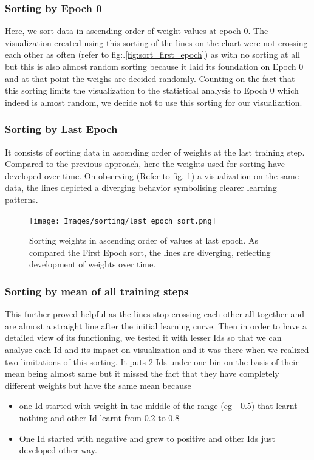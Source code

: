 \documentclass[journal]{vgtc}                %
\begin{document}
\subsubsection{Sorting by Epoch 0}Here, we sort data in ascending order of weight values at epoch 0. The visualization created using this sorting of the lines on the chart were not crossing each other as often (refer to fig:.\ref{fig:sort_first_epoch}) as with no sorting at all but this is also almost random sorting because it laid its foundation on Epoch 0 and at that point the weighs are decided randomly.
Counting on the fact that this sorting limits the visualization to the statistical analysis to Epoch 0 which indeed is almost random, we decide not to use this sorting for our visualization.

\subsubsection{Sorting by Last Epoch} It consists of sorting data in ascending order of weights at the last training step.
Compared to the previous approach, here the weights used for sorting have developed over time.
On observing (Refer to fig. \ref{fig:sort_last_epoch}) a visualization on the same data,
the lines depicted a diverging behavior symbolising clearer learning patterns.
\begin{figure}
    \texttt{[image: Images/sorting/last\_epoch\_sort.png]}
    \caption{Sorting weights in ascending order of values at last epoch. As compared the First Epoch sort, the lines are diverging, reflecting development of weights over time.}
    \label{fig:sort_last_epoch}
\end{figure}

\subsubsection{Sorting by mean of all training steps} This further proved helpful as the lines stop crossing each other all together and are almost a straight line after the initial learning curve. Then in order to have a detailed view of its functioning, we tested it with lesser Ids so that we can analyse each Id and its impact on visualization and it was there when we realized two limitations of this sorting. It puts 2 Ids under one bin on the basis of their mean being almost same but it missed the fact that they have completely different weights but  have the same mean because
\begin{itemize}
    \item one Id started with weight in the middle of the range (eg - 0.5) that learnt nothing and other Id learnt from 0.2 to 0.8  
    \item One Id started with negative and grew to positive and other Ids just developed other way.
\end{itemize}
\end{document}

